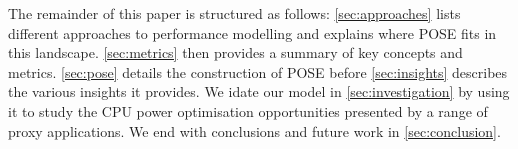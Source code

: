 The remainder of this paper is structured as follows: \autoref{sec:approaches} lists different approaches to performance modelling and explains where POSE fits in this landscape.
\autoref{sec:metrics} then provides a summary of key concepts and metrics.
\autoref{sec:pose} details the construction of POSE before \autoref{sec:insights} describes the various insights it provides.
We idate our model in \autoref{sec:investigation} by using it to study the CPU power optimisation opportunities presented by a range of proxy applications. 
We end with conclusions and future work in \autoref{sec:conclusion}.
